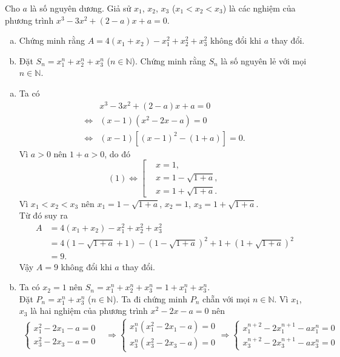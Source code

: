 \begin{ex}%
Cho $a$ là số nguyên dương. Giả sử $x_1$, $x_2$, $x_3$ ($x_1<x_2<x_3$) là các nghiệm của phương trình $x^3-3x^2+(2-a)x+a=0$.
\begin{enumerate}[a)]
\item Chứng minh rằng $A=4(x_1+x_2)-x_1^2+x_2^2+x_3^2$ không đổi khi $a$ thay đổi.
\item Đặt $S_n=x_1^n+x_2^n+x_3^n$ ($n\in\mathbb{N}$). Chứng minh rằng $S_n$ là số nguyên lẻ với mọi $n\in\mathbb{N}$.
\end{enumerate}
\loigiai
    {
\begin{enumerate}[a)]
\item Ta có \begin{align*}
&x^3-3x^2+(2-a)x+a=0\\ 
\Leftrightarrow&(x-1)(x^2-2x-a)=0\\
\Leftrightarrow&(x-1)\left[(x-1)^2-(1+a)\right]=0.\tag{1}
\end{align*}
Vì $a>0$ nên $1+a>0$, do đó
$$(1)\Leftrightarrow\left[\begin{aligned} &x=1,\\&x=1-\sqrt{1+a},\\&x=1+\sqrt{1+a}. \end{aligned}\right.$$
Vì $x_1<x_2<x_3$ nên $x_1=1-\sqrt{1+a}$, $x_2=1$, $x_3=1+\sqrt{1+a}$.\\
Từ đó suy ra \begin{align*}
A&=4(x_1+x_2)-x_1^2+x_2^2+x_3^2\\ 
&=4(1-\sqrt{1+a}+1)-(1-\sqrt{1+a})^2+1+(1+\sqrt{1+a})^2\\
&=9.
\end{align*}
Vậy $A=9$ không đổi khi $a$ thay đổi.
\item Ta có $x_2=1$ nên $S_n=x_1^n+x_2^n+x_3^n=1+x_1^n+x_3^n$.\\ 
Đặt $P_n=x_1^n+x_3^n$ ($n\in\mathbb{N}$). Ta đi chứng minh $P_n$ chẵn với mọi $n\in\mathbb{N}$. Vì $x_1$, $x_3$ là hai nghiệm của phương trình $x^2-2x-a=0$ nên
\begin{align*}
\begin{cases}x_1^2-2x_1-a=0\\x_3^2-2x_3-a=0\end{cases}&\Rightarrow\begin{cases}x_1^n(x_1^2-2x_1-a)=0\\x_3^n(x_3^2-2x_3-a)=0\end{cases}\Rightarrow \begin{cases}x_1^{n+2}-2x_1^{n+1}-ax_1^n=0\\x_3^{n+2}-2x_3^{n+1}-ax_3^n=0\end{cases}\\ 

\end{align*}
\end{enumerate}}
\end{ex}

